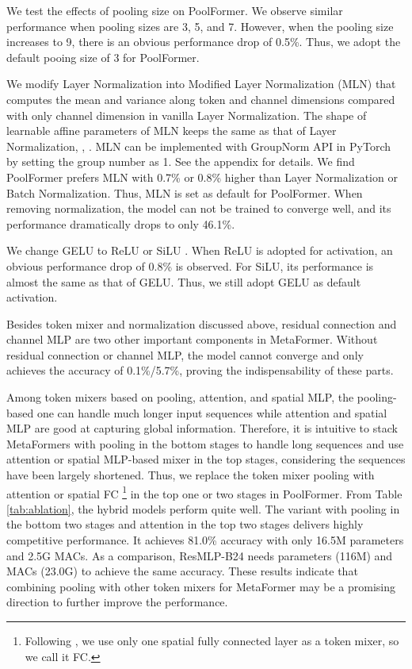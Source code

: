 We test the effects of pooling size on PoolFormer. We observe similar performance when pooling sizes are 3,  5, and 7. However, when the pooling size increases to 9, there is an obvious performance drop of 0.5\%.  Thus, we adopt the default pooing size of 3 for PoolFormer. 


 We modify Layer Normalization \cite{layer_norm} into Modified Layer Normalization (MLN) that computes the mean and variance along token and channel dimensions compared with only channel dimension in vanilla Layer Normalization. The shape of learnable affine parameters of MLN keeps the same as that of Layer Normalization, \ie, . MLN can be implemented with GroupNorm API in PyTorch by setting the group number as 1. See the appendix for details. We find PoolFormer prefers MLN with 0.7\% or 0.8\% higher than Layer Normalization or Batch Normalization. Thus, MLN is set as default for PoolFormer. When removing normalization, the model can not be trained to converge well, and its performance dramatically drops to only 46.1\%.


 We change GELU \cite{gelu} to ReLU \cite{relu} or SiLU \cite{silu}. When ReLU is adopted for activation, an obvious performance drop of 0.8\% is observed. For SiLU, its performance is almost the same as that of GELU. Thus, we still adopt GELU as default activation. 


 Besides token mixer and normalization discussed above, residual connection \cite{resnet} and channel MLP \cite{rosenblatt1961principles, rumelhart1985learning} are two other important components in MetaFormer. Without residual connection or channel MLP, the model cannot converge and only achieves the accuracy of 0.1\%/5.7\%, proving the indispensability of these parts.


 Among token mixers based on pooling, attention, and spatial MLP, the pooling-based one can handle much longer input sequences while attention and spatial MLP are good at capturing global information. 
Therefore, it is intuitive to stack MetaFormers with pooling in the bottom stages to handle long sequences and use attention or spatial MLP-based mixer in the top stages, considering the sequences have been largely shortened. Thus, we replace the token mixer pooling with attention or spatial FC \footnote{Following \cite{resmlp}, we use only one spatial fully connected layer as a token mixer, so we call it FC.} in the top one or two stages in PoolFormer. From Table \ref{tab:ablation}, the hybrid models perform quite well. The variant with pooling in the bottom two stages and attention in the top two stages delivers highly competitive performance. 
It achieves 81.0\% accuracy with only 16.5M parameters and 2.5G MACs. 
As a comparison, ResMLP-B24 needs  parameters (116M) and  MACs (23.0G) to achieve the same accuracy. These results indicate that combining pooling with other token mixers for MetaFormer may be a promising direction to further improve the performance. 




